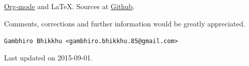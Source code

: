 \documentclass[11pt,oneside]{memoir-article}
\begin{document}
\href{http://orgmode.org/}{Org-mode} and \LaTeX. Sources at \href{https://github.com/profound-labs/calculating-the-uposatha-moondays/}{Github}.

Comments, corrections and further information would be greatly
appreciated.

\texttt{Gambhiro Bhikkhu <gambhiro.bhikkhu.85@gmail.com>}

Last updated on 2015-09-01.





\end{document}
